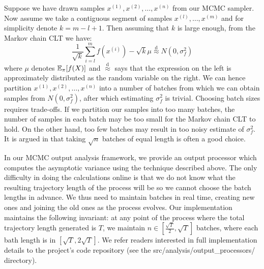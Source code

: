 \documentclass[report.tex]{subfiles}
\begin{document}
Suppose we have drawn samples $x^{(1)}, x^{(2)}, \dots, x^{(n)}$ from our MCMC sampler.
Now assume we take a contiguous segment of samples $x^{(l)}, \dots, x^{(m)}$ and for
simplicity denote $k = m - l + 1$. Then assuming that $k$ is large enough, from the
Markov chain CLT we have:
$$
\frac{1}{\sqrt{k}} \sum_{i = l}^{m} f(x^{(i)}) - \sqrt{k}\mu \stackrel{\text{d}}{\approx} N(0, \sigma_{f}^{2})
$$
where $\mu$ denotes $\mathbb{E}_{{\pi}}\!\left[{f(X)}\right]$ and $\stackrel{\text{d}}{\approx}$
says that the expression on the
left is approximately distributed as the random variable on the right.
We can hence partition $x^{(1)}, x^{(2)}, \dots, x^{(n)}$ into a number of batches from
which we can obtain samples from $N(0, \sigma_{f}^{2})$, after which estimating
$\sigma_{f}^{2}$ is trivial.
Choosing batch sizes requires trade-offs. If we partition our samples into too many batches,
the number of samples in each batch may be too small for the Markov chain CLT to hold.
On the other hand, too few batches may result in too noisy estimate of $\sigma_{f}^{2}$.
It is argued in \citet{flegal2008markov} that taking $\sqrt{n}$ batches of
equal length is often a good choice.

In our MCMC output analysis framework, we provide an output processor which computes
the asymptotic variance using the technique described above.
The only difficulty in doing the calculations online is that we do not know what the
resulting trajectory length of the process will be so we cannot choose the batch lengths
in advance.
We thus need to maintain batches in real time, creating new ones and joining the old ones
as the process evolves.
Our implementation maintains the following invariant: at any point of the process where
the total trajectory length generated is $T$, we maintain $n \in [\frac{\sqrt{T}}{2}, \sqrt{T}]$
batches, where each bath length is in $[\sqrt{T}, 2\sqrt{T}]$.
We refer readers interested in full implementation details to the project's code repository
(see the src/analysis/output\_processors/ directory).
\end{document}
